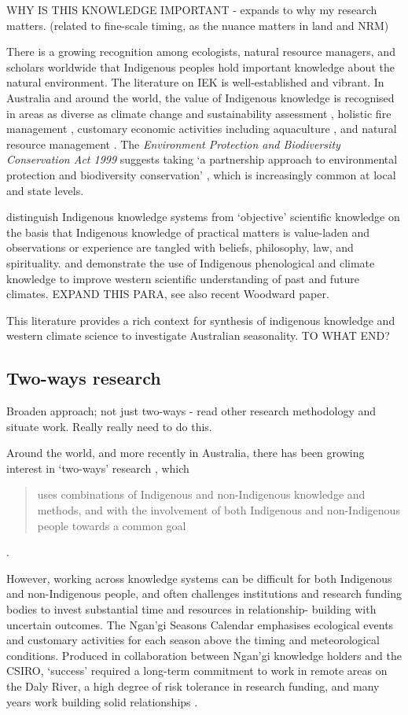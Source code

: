 WHY IS THIS KNOWLEDGE IMPORTANT - expands to why my research matters.
(related to fine-scale timing, as the nuance matters in land and NRM)

There is a growing recognition among ecologists, natural resource managers, and
scholars worldwide that Indigenous peoples hold important knowledge about the
natural environment. The literature on IEK is well-established and vibrant.  In
Australia and around the world, the value of Indigenous knowledge is recognised
in areas as diverse as climate change and sustainability assessment
\citep[eg.][]{cochran2015}, holistic fire management \citep[eg.][]{clarke2009,price2012},
customary economic activities including aquaculture \citep{woodward2012a}, and
natural resource management \citep[eg.][]{prober2011}.  The \textit{Environment
Protection and Biodiversity Conservation Act 1999} suggests taking `a
partnership approach to environmental protection and biodiversity conservation'
\citep{ens2012}, which is increasingly common at local and state levels.

\citet{turner2009} distinguish Indigenous knowledge systems from `objective'
scientific knowledge on the basis that Indigenous knowledge of practical
matters is value-laden and observations or experience are tangled with beliefs,
philosophy, law, and spirituality.  \citet{green2010a} and \citet{clarke2009}
demonstrate the use of Indigenous phenological and climate knowledge to improve
western scientific understanding of past and future climates.
EXPAND THIS PARA, see also recent Woodward paper.

This literature provides a rich context for synthesis of indigenous knowledge
and western climate science to investigate Australian seasonality.
TO WHAT END?



\subsection{Two-ways research}
Broaden approach; not just two-ways - read other research methodology and
situate work.  Really really need to do this.

Around the world, and more recently in Australia, there has been growing
interest in `two-ways' research \citep{turner2009,prober2011},
which \blockquote{uses combinations of Indigenous and non-Indigenous knowledge and
methods, and with the involvement of both Indigenous and non-Indigenous people
towards a common goal} \citep{ens2014}.

However, working across knowledge systems can be difficult for both Indigenous
and non-Indigenous people, and often challenges institutions and research
funding bodies to invest substantial time and resources in relationship-
building with uncertain outcomes.  The Ngan'gi Seasons Calendar emphasises
ecological events and customary activities for each season above the timing and
meteorological conditions.  Produced in collaboration between Ngan'gi knowledge
holders and the CSIRO, `success' required a long-term commitment to work in
remote areas on the Daly River, a high degree of risk tolerance in
research funding, and many years work building solid relationships \citep{woodward2010}.

